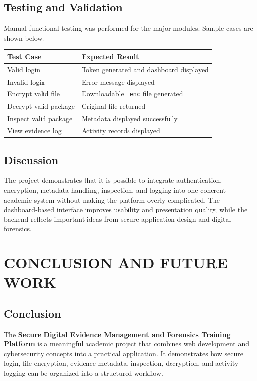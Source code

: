 \documentclass[12pt,a4paper]{report}
\begin{document}
\section{Testing and Validation}
Manual functional testing was performed for the major modules. Sample cases are shown below.

\begin{longtable}{|p{2.4in}|p{2.8in}|}
\hline
\textbf{Test Case} & \textbf{Expected Result} \\ \hline
Valid login & Token generated and dashboard displayed \\ \hline
Invalid login & Error message displayed \\ \hline
Encrypt valid file & Downloadable \texttt{.enc} file generated \\ \hline
Decrypt valid package & Original file returned \\ \hline
Inspect valid package & Metadata displayed successfully \\ \hline
View evidence log & Activity records displayed \\ \hline
\end{longtable}

\section{Discussion}
The project demonstrates that it is possible to integrate authentication, encryption, metadata handling, inspection, and logging into one coherent academic system without making the platform overly complicated. The dashboard-based interface improves usability and presentation quality, while the backend reflects important ideas from secure application design and digital forensics.

\chapter{CONCLUSION AND FUTURE WORK}

\section{Conclusion}
The \textbf{Secure Digital Evidence Management and Forensics Training Platform} is a meaningful academic project that combines web development and cybersecurity concepts into a practical application. It demonstrates how secure login, file encryption, evidence metadata, inspection, decryption, and activity logging can be organized into a structured workflow.
\end{document}
